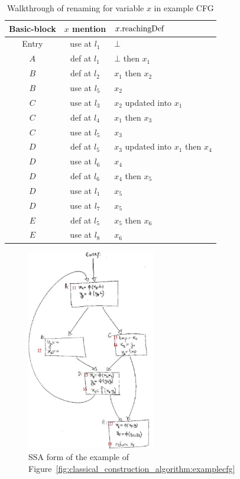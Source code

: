 \begin{table}
\begin{tabular}{c|c|l}
Basic-block & $x$ mention &  $x.\mathrm{reachingDef}$ \\ \hline
Entry & use at $l_1$ & $\bot$\\
$A$ & def at $l_1$ &  $\bot$ then $x_1$\\
$B$ & def at $l_2$ &  $x_1$ then $x_2$\\
$B$ & use at $l_5$ & $x_2$\\
$C$ & use at $l_3$ & $x_2$ updated into $x_1$\\
$C$ & def at $l_4$ &  $x_1$ then $x_3$\\
$C$ & use at $l_5$ & $x_3$\\
$D$ & def at $l_5$ & $x_3$ updated into $x_1$ then $x_4$\\
$D$ & use at $l_6$ & $x_4$\\
$D$ & def at $l_6$ & $x_4$ then $x_5$\\
$D$ & use at $l_1$ & $x_5$\\
$D$ & use at $l_7$ & $x_5$\\
$E$ & def at $l_5$ & $x_5$ then $x_6$\\
$E$ & use at $l_8$ & $x_6$
\end{tabular}
\caption{\label{table:classical_construction_algorithm:renaming}Walkthrough of renaming for variable $x$ in example CFG}
\end{table}

\begin{figure}
\includegraphics[width=0.5\textwidth]{renaming_label.pdf}
\caption{\label{fig:classical_construction_algorithm:renaming} SSA form of the example of Figure~\ref{fig:classical_construction_algorithm:examplecfg}}
\end{figure}

